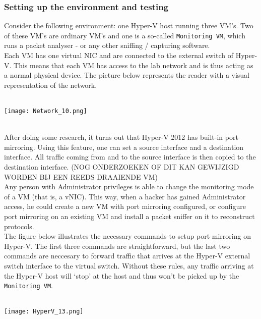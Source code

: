 \subsubsection{Setting up the environment and testing}

Consider the following environment: one Hyper-V host running three VM's. Two of these VM's are ordinary VM's and one is a so-called \texttt{Monitoring VM}, which runs a packet analyser - or any other sniffing / capturing software. \\
Each VM has one virtual NIC and are connected to the external switch of Hyper-V. This means that each VM has access to the lab network and is thus acting as a normal physical device. The picture below represents the reader with a visual representation of the network.
$\;$ \\ \\
\noindent\begin{minipage}{\textwidth}
    \centering
    \texttt{[image: Network\_10.png]}
\label{fig:network}
\end{minipage}
$\;$ \\ \\
After doing some research, it turns out that Hyper-V 2012 has built-in port mirroring. Using this feature, one can set a source interface and a destination interface. All traffic coming from and to the source interface is then copied to the destination interface. (NOG ONDERZOEKEN OF DIT KAN GEWIJZIGD WORDEN BIJ EEN REEDS DRAAIENDE VM) \\ 
Any person with Administrator privileges is able to change the monitoring mode of a VM (that is, a vNIC). This way, when a hacker has gained Administrator access, he could create a new VM with port mirroring configured, or configure port mirroring on an existing VM and install a packet sniffer on it to reconstruct protocols. \\
The figure below illustrates the necessary commands to setup port mirroring on Hyper-V. The first three commands are straightforward, but the last two commands are neccesary to forward traffic that arrives at the Hyper-V external switch interface to the virtual switch. Without these rules, any traffic arriving at the Hyper-V host will `stop' at the host and thus won't be picked up by the \texttt{Monitoring VM}.
$\;$ \\ \\
\noindent\begin{minipage}{\textwidth}
    \centering
    \texttt{[image: HyperV\_13.png]}
\label{fig:network}
\end{minipage}
